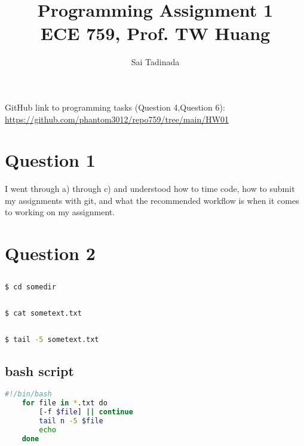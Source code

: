 \documentclass[12pt]{article}
\title{Programming Assignment 1 \\ \small{ECE 759, Prof. TW Huang}}
\author{Sai Tadinada}
\date{}
\begin{document}
\maketitle

GitHub link to programming tasks (Question 4,Question 6): \\ \url{https://github.com/phantom3012/repo759/tree/main/HW01}

\section{Question 1}
I went through a) through c) and understood how to time code, how to submit my assignments with git, and what the recommended workflow is when it comes to working on my assignment.

\section{Question 2}

\subsection{}

\begin{lstlisting}[language=bash]
    $ cd somedir    
\end{lstlisting}

\subsection{}
\begin{lstlisting}[language=bash]
    $ cat sometext.txt
\end{lstlisting}

\subsection{}
\begin{lstlisting}[language=bash]
    $ tail -5 sometext.txt    
\end{lstlisting}

\pagebreak

\subsection{bash script}
\begin{lstlisting}[language=bash]
    #!/bin/bash
    for file in *.txt do
        [-f $file] || continue
        tail n -5 $file
        echo
    done
\end{lstlisting}
\end{document}
